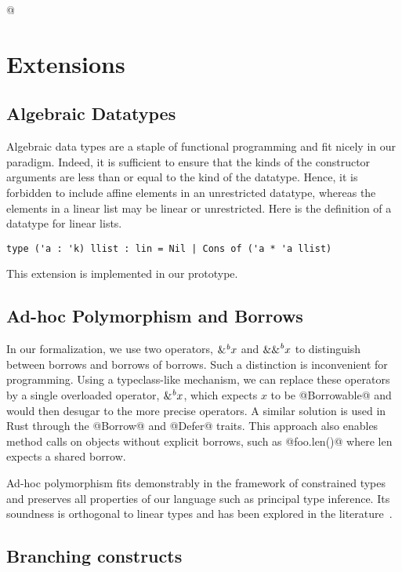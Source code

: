 \lstMakeShortInline[keepspaces,basicstyle=\small\ttfamily]@
\section{Extensions}

\subsection{Algebraic Datatypes}

Algebraic data types are a staple of functional programming and fit nicely
in our paradigm. Indeed, it is sufficient to ensure  that the kinds of
the constructor arguments are less than or equal to the kind of the datatype.
Hence, it is forbidden to include affine elements in an unrestricted
datatype, whereas the elements in a linear list may be linear or
unrestricted. 
Here is the definition of a datatype for linear lists.

\begin{lstlisting}
type ('a : 'k) llist : lin = Nil | Cons of ('a * 'a llist)
\end{lstlisting}

This extension is implemented in our prototype.

\subsection{Ad-hoc Polymorphism and Borrows}

In our formalization, we use two operators, ${\&}^{\textit{b}}x$ and ${\&\&}^{\textit{b}}x$ to
distinguish between borrows and borrows of borrows.
Such a distinction is inconvenient for programming.
Using a typeclass-like mechanism, we can replace these operators
by a single overloaded operator, ${\&}^{\textit{b}}x$, which expects $x$ to be @Borrowable@ and
would then desugar to the more precise operators.
A similar solution is used in Rust through the @Borrow@ and @Defer@
traits.
This approach also enables method calls on objects without
explicit borrows, such as @foo.len()@ where len expects a shared borrow.

Ad-hoc polymorphism fits demonstrably in the \hmx framework of constrained
types and preserves all properties of our language such
as principal type inference. Its soundness is orthogonal to linear types
and has been explored in the literature~\citep{DBLP:conf/fpca/OderskyWW95}.

\subsection{Branching constructs}


